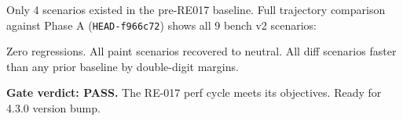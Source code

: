

Only 4 scenarios existed in the pre-RE017 baseline. Full trajectory comparison against Phase A (\texttt{H\allowbreak{}E\allowbreak{}A\allowbreak{}D\allowbreak{}-\allowbreak{}f\allowbreak{}9\allowbreak{}6\allowbreak{}6\allowbreak{}c\allowbreak{}7\allowbreak{}2}) shows all 9 bench v2 scenarios:



Zero regressions. All paint scenarios recovered to neutral. All diff scenarios faster than any prior baseline by double-digit margins.

\textbf{Gate verdict: PASS.} The RE-017 perf cycle meets its objectives. Ready for 4.3.0 version bump.

